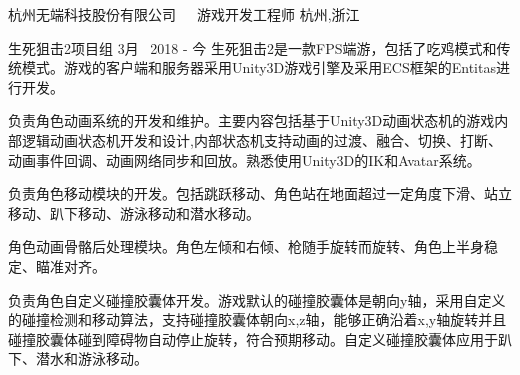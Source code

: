 


\begin{cventries}


\cventrycompany
{杭州无端科技股份有限公司~~~游戏开发工程师} %
{杭州,浙江} %

\cventryproject
{生死狙击2项目组} %
{3月~ 2018 - 今} %
{生死狙击2是一款FPS端游，包括了吃鸡模式和传统模式。游戏的客户端和服务器采用Unity3D游戏引擎及采用ECS框架的Entitas进行开发。}
{ %
\begin{cvitems}
\item {负责角色动画系统的开发和维护。主要内容包括基于Unity3D动画状态机的游戏内部逻辑动画状态机开发和设计,内部状态机支持动画的过渡、融合、切换、打断、动画事件回调、动画网络同步和回放。熟悉使用Unity3D的IK和Avatar系统。}
\item{负责角色移动模块的开发。包括跳跃移动、角色站在地面超过一定角度下滑、站立移动、趴下移动、游泳移动和潜水移动。}
\item{角色动画骨骼后处理模块。角色左倾和右倾、枪随手旋转而旋转、角色上半身稳定、瞄准对齐。}
\item{负责角色自定义碰撞胶囊体开发。游戏默认的碰撞胶囊体是朝向y轴，采用自定义的碰撞检测和移动算法，支持碰撞胶囊体朝向x,z轴，能够正确沿着x,y轴旋转并且碰撞胶囊体碰到障碍物自动停止旋转，符合预期移动。自定义碰撞胶囊体应用于趴下、潜水和游泳移动。}
\end{cvitems}
}


\end{cventries}
